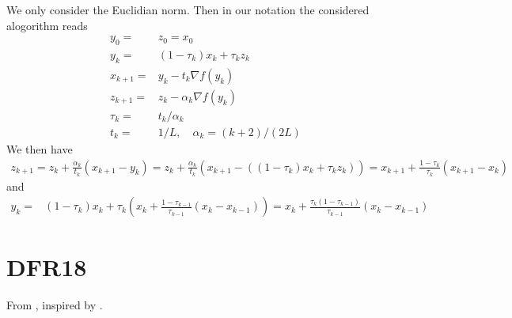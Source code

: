\documentclass[12pt,english]{article}
\begin{document}
We only consider the Euclidian norm. Then in our notation the considered alogorithm reads
%
\begin{align*}
y_0=&z_0=x_0\\
y_{k} =& (1-\tau_k) x_k + \tau_k z_k\\
x_{k+1} =& y_k - t_k \nabla f(y_k)\\
z_{k+1} =& z_k - \alpha_k  \nabla f(y_k)\\
\tau_k =& t_k/\alpha_k\\
t_k =& 1/L,\quad \alpha_k=(k+2)/(2L) 
\end{align*}
%
We then have
%
\begin{align*}
z_{k+1} = z_k + \frac{\alpha_k}{t_k}  (x_{k+1} - y_k)
= z_k + \frac{\alpha_k}{t_k}  (x_{k+1} - ((1-\tau_k) x_k + \tau_k z_k))
= x_{k+1} + \frac{1-\tau_k}{\tau_k}(x_{k+1}-x_k)
\end{align*}
%
and
%
\begin{align*}
y_{k} =& (1-\tau_k) x_k + \tau_k (x_{k} + \frac{1-\tau_{k-1}}{\tau_{k-1}}(x_{k}-x_{k-1}))
=  x_k  + \frac{\tau_k(1-\tau_{k-1})}{\tau_{k-1}}(x_{k}-x_{k-1})
\end{align*}
%
%
\section{DFR18}\label{sec:}
%
From \cite{DrusvyatskiyFazelRoy18a}, inspired by \cite{BubeckLeeSingh15}.
\end{document}
